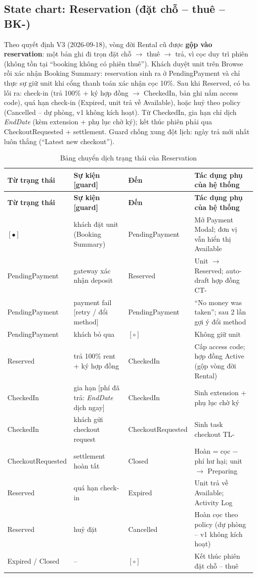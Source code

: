 \documentclass[12pt,a4paper]{article}
\newcommand{\attr}[1]{\textit{#1}}
\renewcommand{\_}{\textunderscore\allowbreak}
\begin{document}
\subsection{State chart: Reservation (đặt chỗ -- thuê -- BK-)}

Theo quyết định V3 (2026-09-18), vòng đời Rental cũ được \textbf{gộp vào reservation}: một bản ghi đi trọn đặt chỗ $\rightarrow$ thuê $\rightarrow$ trả, vì cọc duy trì phiên (không tồn tại ``booking không có phiên thuê''). Khách duyệt unit trên Browse rồi xác nhận Booking Summary: reservation sinh ra ở PendingPayment và chỉ thực sự giữ unit khi cổng thanh toán xác nhận cọc 10\%. Sau khi Reserved, có ba lối ra: check-in (trả 100\% + ký hợp đồng $\rightarrow$ CheckedIn, bản ghi nắm access code), quá hạn check-in (Expired, unit trả về Available), hoặc huỷ theo policy (Cancelled -- dự phòng, v1 không kích hoạt). Từ CheckedIn, gia hạn chỉ dịch \attr{EndDate} (kèm extension + phụ lục chờ ký); kết thúc phiên phải qua CheckoutRequested + settlement. Guard chống xung đột lịch: ngày trả mới nhất luôn thắng (``Latest new checkout'').

\begin{xltabular}{\textwidth}{|p{2.6cm}|p{4.4cm}|p{2.6cm}|X|}
\caption{Bảng chuyển dịch trạng thái của Reservation} \\
\hline
\textbf{Từ trạng thái} & \textbf{Sự kiện [guard]} & \textbf{Đến} & \textbf{Tác dụng phụ của hệ thống} \\ \hline
\endfirsthead
\hline
\textbf{Từ trạng thái} & \textbf{Sự kiện [guard]} & \textbf{Đến} & \textbf{Tác dụng phụ của hệ thống} \\ \hline
\endhead
$[\bullet]$ & khách đặt unit (Booking Summary) & PendingPayment & Mở Payment Modal; đơn vị vẫn hiển thị Available \\ \hline
PendingPayment & gateway xác nhận deposit & Reserved & Unit $\rightarrow$ Reserved; auto-draft hợp đồng CT- \\ \hline
PendingPayment & payment fail [retry / đổi method] & PendingPayment & ``No money was taken''; sau 2 lần gợi ý đổi method \\ \hline
PendingPayment & khách bỏ qua & $[\circ]$ & Không giữ unit \\ \hline
Reserved & trả 100\% rent + ký hợp đồng & CheckedIn & Cấp access code; hợp đồng Active (gộp vòng đời Rental) \\ \hline
CheckedIn & gia hạn [phí đã trả: \attr{EndDate} dịch ngay] & CheckedIn & Sinh extension + phụ lục chờ ký \\ \hline
CheckedIn & khách gửi checkout request & CheckoutRequested & Sinh task checkout TL- \\ \hline
CheckoutRequested & settlement hoàn tất & Closed & Hoàn = cọc $-$ phí hư hại; unit $\rightarrow$ Preparing \\ \hline
Reserved & quá hạn check-in & Expired & Unit trả về Available; Activity Log \\ \hline
Reserved & huỷ đặt & Cancelled & Hoàn cọc theo policy (dự phòng -- v1 không kích hoạt) \\ \hline
Expired / Closed & -- & $[\circ]$ & Kết thúc phiên đặt chỗ -- thuê \\ \hline
\end{xltabular}
\end{document}
